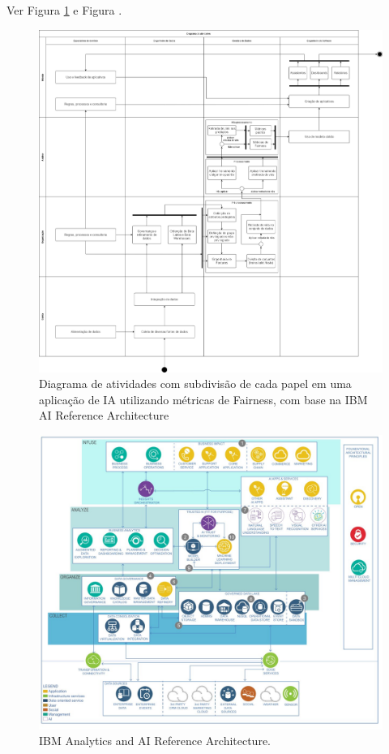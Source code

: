 \documentclass[portugues, 12pt, a4paper]{article}
\begin{document}
Ver Figura \ref{fig:AIRoles} e Figura \label{fig:AIReferenceArchitecture}.

\begin{figure}[h]
\centering
\includegraphics[scale=0.25]{images/Diagrama_Atividades_update.jpg}
\caption {Diagrama de atividades com subdivisão de cada papel em uma aplicação de IA utilizando métricas de Fairness, com base na IBM AI Reference Architecture~\citep{IBM_2021}}
\label{fig:AIRoles}
\end{figure}

\begin{figure}[h]
\centering
\includegraphics[scale=0.4]{images/ai-analytics-ref-diagram-analyze.jpg}
\caption {IBM Analytics and AI Reference Architecture.}
\label{fig:AIReferenceArchitecture}
\end{figure}
\end{document}
